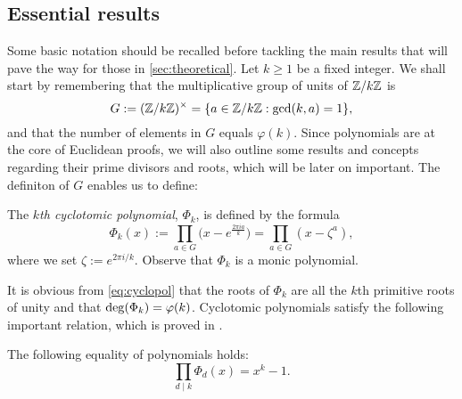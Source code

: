 \documentclass[../main.tex]{subfiles}
\begin{document}
\subsection{Essential results}

Some basic notation should be recalled before tackling the main results that will pave the way for those in \cref{sec:theoretical}. Let $k\geqslant 1$ be a fixed integer. We shall start by remembering that the multiplicative group of units of $\mathbb{Z}/k\mathbb{Z}$ is 
	\begin{equation*}
		G:=(\mathbb{Z}/k\mathbb{Z})^\times=\{a\in \mathbb{Z}/k\mathbb{Z}: \gcd(k,a)=1\},
	\end{equation*}
 and that the number of elements in $G$ equals $\varphi(k)$. Since polynomials are at the core of Euclidean proofs, we will also outline some results and concepts regarding their prime divisors and roots, which will be later on important. The definiton of $G$ enables us to define:
\begin{definition}\label{def:cyclotomicpol}
	The \emph{$k$th cyclotomic polynomial}, $\Phi_k$, is defined by the formula
	\begin{equation}\label{eq:cyclopol}
		\Phi_k(x):=\prod_{a\in G}\big(x-e^{\frac{2\pi ia}{k}}\big)=\prod_{a\in G}(x-\zeta^a),
	\end{equation}
	where we set $\zeta:=e^{2\pi i/k}$. Observe that $\Phi_k$ is a monic polynomial.
\end{definition}
It is obvious from \cref{eq:cyclopol} that the roots of $\Phi_k$ are all the $k$th primitive roots of unity and that $\operatorname{deg}(\Phi_k)=\varphi(k)$. Cyclotomic polynomials satisfy the following important relation, which is proved in \cite{StevenRoman}.
\begin{lemma}
	The following equality of polynomials holds:
	\begin{equation}\label{eq:divisorscyclo}
		\prod_{d\mid k}\Phi_d(x)=x^k-1.
	\end{equation}
\end{lemma}
\end{document}
